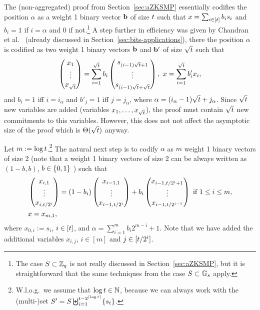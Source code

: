 The (non-aggregated) proof from Section~\ref{sec:aZKSMP} essentially codifies the position \(\alpha\) as a weight 1 binary vector \(\mathbf{b}\) of size \(t \) such that \(x=\sum_{i\in[t ]}b_is_i\) and
\(b_i=1\) if \(i=\alpha\) and \(0\) if not.\footnote{The case \(S\subset\mathbb{Z}_q\) is not really discussed in Section~\ref{sec:aZKSMP}, but it is straightforward that the same techniques from the case \(S\subset\mathbb{G}_s\) apply.} A step further in efficiency was given by Chandran et al.~\cite{ICALP:ChaGroSah07} (already discussed in Section~\ref{sec:bits-applications}), there the position \(\alpha\) is codified as two weight 1 binary vectors \(\mathbf{b}\) and \(\mathbf{b}'\) of size \(\sqrt{t }\) such that
\[
\begin{pmatrix}
x_1\\\vdots\\x_{\sqrt{t }}
\end{pmatrix}
=\sum_{i=1}^{\sqrt{t }}b_i
\begin{pmatrix}
s_{(i-1)\sqrt{t }+1}\\\vdots\\s_{(i-1)\sqrt{t }+\sqrt{t }}
\end{pmatrix},
\text{ } x=\sum_{i=1}^{\sqrt{t }}b'_ix_i,\]
and \(b_i=1\) iff \(i=i_\alpha\) and \(b'_j=1\) iff \(j=j_\alpha\), where \(\alpha=(i_\alpha-1)\sqrt{t }+j_\alpha\). Since \(\sqrt{t }\) new variables are added (variables \(x_1,\ldots,x_{\sqrt{t }}\)), the proof must contain \(\sqrt{t }\) new commitments to this variables. However, this does not not affect the asymptotic size of the proof which is \(\Theta(\sqrt{t })\) anyway.


Let $m:=\log t$.\footnote{ W.l.o.g.~we assume that \(\log t \in\mathbb{N}\), because we can always work with the (multi-)set \(S'=S\biguplus_{i=1}^{t -2^{\lceil \log t  \rceil}}\{s_{t} \}\).} The natural next step is to codify \(\alpha\) as \(m\) weight 1 binary vectors of size 2 (note that a weight 1 binary vectors of size 2 can be always written as \((1-b,b)\), \(b\in\{0,1\}\) ) such that
\begin{align}
&\begin{pmatrix}
x_{i,1}\\\vdots\\x_{i,t /{2^i}}
\end{pmatrix}
=
(1-b_i)
\begin{pmatrix}
x_{i-1,1}\\\vdots\\x_{i-1,t /{2^i}}
\end{pmatrix}
+
b_i
\begin{pmatrix}
x_{i-1, t /{2^i}+1}\\\vdots\\x_{i-1, t /{2^{i-1}}}
\end{pmatrix}
\text{ if } 1 \leq  i \leq m,\label{eq-log-2}\\
&
x= x_{m,1}\label{eq-log-3},
\end{align}
where \(x_{0,i}:=s_i\), \(i\in[t ]\), and \(\alpha=\sum_{i=1}^{m}b_i2^{m-i}+1\). Note that we have added the additional variables \(x_{i,j}\), \(i\in[m]\) and \(j\in[t /2^i]\).

